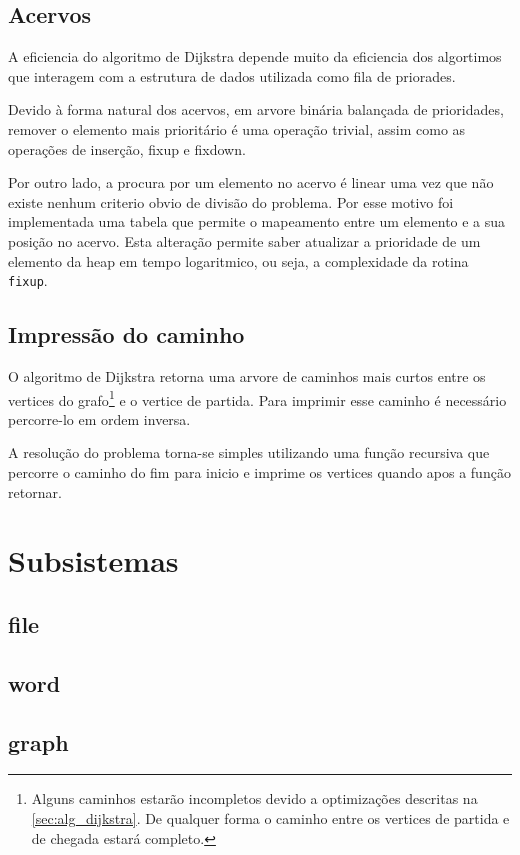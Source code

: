 \documentclass[a4paper, 18pt]{article}
\begin{document}
\subsection{Acervos}
	\par
	A eficiencia do algoritmo de Dijkstra depende muito da eficiencia dos 
algortimos que interagem com a  estrutura de dados utilizada como fila de 
priorades.
	\par
	Devido à forma natural dos acervos, em arvore binária balançada de 
prioridades, remover o elemento mais prioritário é uma operação trivial, assim 
como as operações de inserção, fixup e fixdown.
	\par Por outro lado, a procura por um elemento no acervo é linear uma vez 
que não existe nenhum criterio obvio de divisão do problema. Por esse motivo 
foi implementada uma tabela que permite o mapeamento entre um elemento e a sua 
posição no acervo.
	Esta alteração permite saber atualizar a prioridade de um elemento da heap 
em tempo logaritmico, ou seja, a complexidade da rotina \texttt{fixup}.
	
\subsection{Impressão do caminho}
	\par
	O algoritmo de Dijkstra retorna uma arvore de caminhos mais curtos entre os 
vertices do grafo\footnote{Alguns caminhos estarão incompletos devido a 
optimizações descritas na \autoref{sec:alg_dijkstra}. De qualquer forma o 
caminho entre os vertices de partida e de chegada estará completo.} e o vertice 
de partida. Para imprimir esse caminho é necessário percorre-lo em ordem 
inversa. 
	\par A resolução do problema torna-se simples utilizando uma função 
recursiva que percorre o caminho do fim para inicio e imprime os vertices 
quando apos a função retornar.


\section{Subsistemas}
	\subsection{file}
	\subsection{word}
	\subsection{graph}
\end{document}
